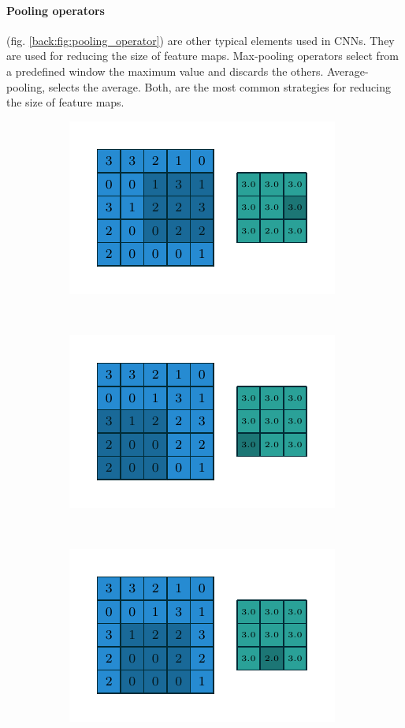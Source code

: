 \paragraph{Pooling operators} (fig. \ref{back:fig:pooling_operator}) are other typical elements used in CNNs. They are used for reducing the size of feature maps. Max-pooling operators select from a predefined window the maximum value and discards the others. Average-pooling, selects the average. Both, are the most common strategies for reducing the size of feature maps.

\begin{figure}[!ht]
	\centering
	\begin{subfigure}{0.2\textwidth}
		\includegraphics[scale=0.5]{Figures/chapter_background/max_pooling/numerical_max_pooling_05.pdf}
	\end{subfigure}
	~ %
	\begin{subfigure}{0.2\textwidth}
		\includegraphics[scale=0.5]{Figures/chapter_background/max_pooling/numerical_max_pooling_06.pdf}
	\end{subfigure}
	~ %
	\begin{subfigure}{0.2\textwidth}
		\includegraphics[scale=0.5]{Figures/chapter_background/max_pooling/numerical_max_pooling_07.pdf}

\end{subfigure}
\end{figure}

